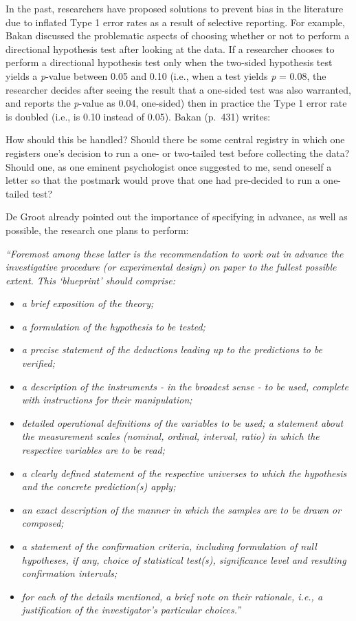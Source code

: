 \documentclass[
  oneside]{krantz}
\providecommand{\tightlist}{%
  \setlength{\itemsep}{0pt}\setlength{\parskip}{0pt}}
\renewenvironment{quote}{\begin{VF}}{\end{VF}}
\begin{document}
In the past, researchers have proposed solutions to prevent bias in the literature due to inflated Type 1 error rates as a result of selective reporting. For example, Bakan \citeyearpar{bakan_test_1966} discussed the problematic aspects of choosing whether or not to perform a directional hypothesis test after looking at the data. If a researcher chooses to perform a directional hypothesis test only when the two-sided hypothesis test yields a \emph{p}-value between 0.05 and 0.10 (i.e., when a test yields \emph{p} = 0.08, the researcher decides after seeing the result that a one-sided test was also warranted, and reports the \emph{p}-value as 0.04, one-sided) then in practice the Type 1 error rate is doubled (i.e., is 0.10 instead of 0.05). Bakan (p.~431) writes:

\begin{quote}
How should this be handled? Should there be some central registry in which one registers one's decision to run a one- or two-tailed test before collecting the data? Should one, as one eminent psychologist once suggested to me, send oneself a letter so that the postmark would prove that one had pre-decided to run a one-tailed test?
\end{quote}

De Groot \citeyearpar{de_groot_methodology_1969} already pointed out the importance of specifying in advance, as well as possible, the research one plans to perform:

\emph{``Foremost among these latter is the recommendation to work out in advance the investigative procedure (or experimental design) on paper to the fullest possible extent. This `blueprint' should comprise:}

\begin{itemize}
\tightlist
\item
  \emph{a brief exposition of the theory;}
\item
  \emph{a formulation of the hypothesis to be tested;}
\item
  \emph{a precise statement of the deductions leading up to the predictions to be verified;}
\item
  \emph{a description of the instruments - in the broadest sense - to be used, complete with instructions for their manipulation;}
\item
  \emph{detailed operational definitions of the variables to be used; a statement about the measurement scales (nominal, ordinal, interval, ratio) in which the respective variables are to be read;}
\item
  \emph{a clearly defined statement of the respective universes to which the hypothesis and the concrete prediction(s) apply;}
\item
  \emph{an exact description of the manner in which the samples are to be drawn or composed;}
\item
  \emph{a statement of the confirmation criteria, including formulation of null hypotheses, if any, choice of statistical test(s), significance level and resulting confirmation intervals;}
\item
  \emph{for each of the details mentioned, a brief note on their rationale, i.e., a justification of the investigator's particular choices.''}
\end{itemize}
\end{document}
